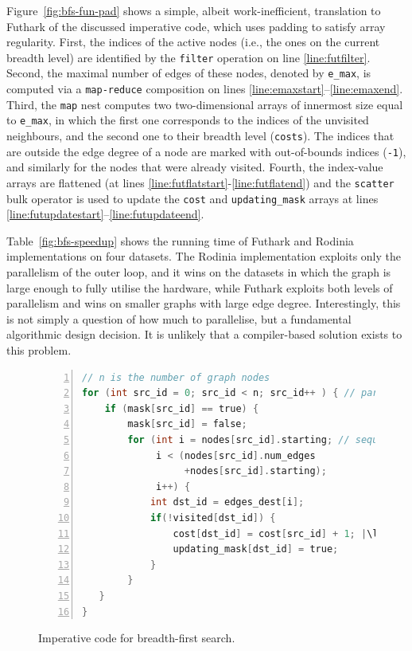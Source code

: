Figure~\ref{fig:bfs-fun-pad} shows a simple, albeit work-inefficient,
translation to Futhark of the discussed imperative code, which uses
padding to satisfy array regularity. First, the indices of the active
nodes (i.e., the ones on the current breadth level) are identified by
the \lstinline{filter} operation on line \ref{line:futfilter}. Second,
the maximal number of edges of these nodes, denoted by
\lstinline{e_max}, is computed via a \lstinline{map-reduce}
composition on lines \ref{line:emaxstart}--\ref{line:emaxend}.  Third,
the \lstinline{map} nest computes two two-dimensional arrays of
innermost size equal to \lstinline{e_max}, in which the first one
corresponds to the indices of the unvisited neighbours, and the second
one to their breadth level (\lstinline{costs}).  The indices that are
outside the edge degree of a node are marked with out-of-bounds
indices (\lstinline{-1}), and similarly for the nodes that were
already visited.
%
Fourth, the index-value arrays are flattened (at lines
\ref{line:futflatstart}-\ref{line:futflatend}) and the
\lstinline{scatter} bulk operator is used to update the
\lstinline{cost} and \lstinline{updating_mask} arrays at lines
\ref{line:futupdatestart}--\ref{line:futupdateend}.

Table~\ref{fig:bfs-speedup} shows the running time of Futhark and
Rodinia implementations on four datasets. The Rodinia implementation
exploits only the parallelism of the outer loop, and it wins on the
datasets in which the graph is large enough to fully utilise the
hardware, while Futhark exploits both levels of parallelism and wins
on smaller graphs with large edge degree.  Interestingly, this is not
simply a question of how much to parallelise, but a fundamental
algorithmic design decision.  It is unlikely that a compiler-based
solution exists to this problem.

\begin{figure}[ht]
\begin{lstlisting}[language=C,numbers=left,escapechar=|]
// n is the number of graph nodes
for (int src_id = 0; src_id < n; src_id++ ) { // parallel
    if (mask[src_id] == true) {
        mask[src_id] = false;
        for (int i = nodes[src_id].starting; // sequential
             i < (nodes[src_id].num_edges
                  +nodes[src_id].starting);
             i++) {
            int dst_id = edges_dest[i];
            if(!visited[dst_id]) {
                cost[dst_id] = cost[src_id] + 1; |\label{line:seqcostupd}|
                updating_mask[dst_id] = true;
            }
        }
   }
}
\end{lstlisting}
  \caption{Imperative code for breadth-first search.}
  \label{fig:bfs-imperative}
\end{figure}

